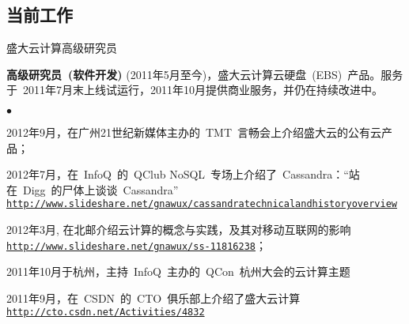 \documentclass[margin,line]{res}
\newenvironment{list1}{
  \begin{list}{\ding{113}}{%
      \setlength{\itemsep}{0in}
      \setlength{\parsep}{0in} \setlength{\parskip}{0in}
      \setlength{\topsep}{0in} \setlength{\partopsep}{0in} 
      \setlength{\leftmargin}{0.17in}}}{\end{list}}
\newenvironment{list2}{
  \begin{list}{$\bullet$}{%
      \setlength{\itemsep}{0in}
      \setlength{\parsep}{0in} \setlength{\parskip}{0in}
      \setlength{\topsep}{0in} \setlength{\partopsep}{0in} 
      \setlength{\leftmargin}{0.2in}}}{\end{list}}
\newcommand{\http}{http:/\hspace{-0.3ex}/}
\newcommand{\hindent}{\mbox{\hspace{8ex}}}
\begin{document}
\begin{resume}
\section{当前工作}
\textsf{盛大云计算高级研究员}\\
\vspace*{-.1in}
\begin{list1}
\item[] \textbf{高级研究员~(软件开发)}\/ (2011年5月至今)，盛大云计算云硬盘~(EBS)~产品。服务于~2011年7月末上线试运行，2011年10月提供商业服务，并仍在持续改进中。
\begin{list2}
\vspace*{.05in}
\item 2012年9月，在广州21世纪新媒体主办的~TMT~言畅会上介绍盛大云的公有云产品；
\item 2012年7月，在~InfoQ~的~QClub NoSQL~专场上介绍了~Cassandra：“站在~Digg~的尸体上谈谈~Cassandra”\\ 
  \hindent\href{http://www.slideshare.net/gnawux/cassandratechnicalandhistoryoverview}{\tt\http{}www.slideshare.net/gnawux/cassandratechnicalandhistoryoverview}
\item 2012年3月, 在北邮介绍云计算的概念与实践，及其对移动互联网的影响 \\ \hindent\href{http://www.slideshare.net/gnawux/ss-11816238}{\tt\http{}www.slideshare.net/gnawux/ss-11816238}；
\item 2011年10月于杭州，主持~InfoQ~主办的~QCon~杭州大会的云计算主题
\item 2011年9月，在~CSDN~的~CTO~俱乐部上介绍了盛大云计算~\\ \hindent\href{http://cto.csdn.net/Activities/4832}{\tt\http{}cto.csdn.net/Activities/4832}
\end{list2}
\end{list1}



\end{resume}
\end{document}
